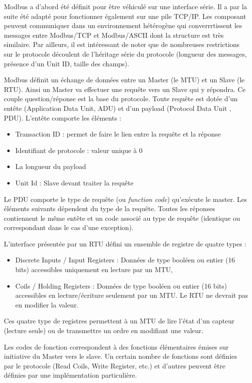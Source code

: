\documentclass[10pt,a4paper]{article}
\begin{document}
		Modbus a d'abord été définit pour être véhiculé sur une interface série. Il a par la suite été adapté pour fonctionner également sur une pile TCP/IP. Les composant peuvent communiquer dans un environnement hétérogène qui converrrtissent les messages entre Modbus/TCP et Modbus/ASCII dont la structure est très similaire. Par ailleurs, il est intéressant de noter que de nombreuses restrictions sur le protocole découlent de l'héritage série du protocole (longueur des messages, présence d'un Unit ID, taille des champs).
		
		
		Modbus définit un échange de données entre un Master (le MTU) et un Slave (le RTU). Ainsi un Master va effectuer une requête vers un Slave qui y répondra. Ce couple question/réponse est la base du protocole.
		Toute requête est dotée d'un entête (Application Data Unit, ADU) et d'un payload (Protocol Data Unit , PDU). L'entête comporte les éléments :
		\begin{itemize}
		\item Transaction ID : permet de faire le lien entre la requête et la réponse
		\item Identifiant de protocole : valeur unique à 0
		\item La longueur du payload
		\item Unit Id : Slave devant traiter la requête
		\end{itemize}
		
		Le PDU comporte le type de requête (ou \textit{function code}) qu'exécute le master. Les éléments suivants dépendent du type de la requête.
		Toutes les réponses contiennent le même entête et un code associé au type de requête (identique ou correspondant dans le cas d'une exception).
		
		L'interface présentée par un RTU défini un ensemble de registre de quatre types :
		\begin{itemize}
		\item Discrete Inputs / Input Registers : Données de type booléen ou entier (16 bits) accessibles uniquement en lecture par un MTU,
		\item Coils / Holding Registers : Données de type booléen ou entier (16 bits) accessibles en lecture/écriture seulement par un MTU. Le RTU ne devrait pas en modifier la valeur.
		\end{itemize}
		Ces quatre type de registres permettent à un MTU de lire l'état d'un capteur (lecture seule) ou de transmettre un ordre en modifiant une valeur.
		
		Les codes de fonction correspondent à des fonctions élémentaires émises sur initiative du Master vers le slave. Un certain nombre de fonctions sont définies par le protocole (Read Coils, Write Register, etc.) et d'autres peuvent être définies par une implémentation particulière.
	
\end{document}
